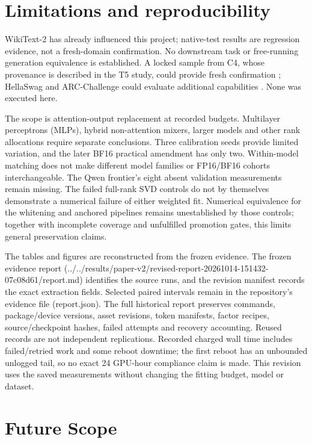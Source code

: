 \documentclass[conference]{IEEEtran}
\begin{document}
\section{Limitations and reproducibility}
WikiText-2 has already influenced this project; native-test results are regression evidence, not a fresh-domain confirmation. No downstream task or free-running generation equivalence is established. A locked sample from C4, whose provenance is described in the T5 study, could provide fresh confirmation \cite{raffel2020t5}; HellaSwag and ARC-Challenge could evaluate additional capabilities \cite{zellers2019hellaswag} \cite{clark2018arc}. None was executed here.\par\smallskip
The scope is attention-output replacement at recorded budgets. Multilayer perceptrons (MLPs), hybrid non-attention mixers, larger models and other rank allocations require separate conclusions. Three calibration seeds provide limited variation, and the later BF16 practical amendment has only two. Within-model matching does not make different model families or FP16/BF16 cohorts interchangeable. The Qwen frontier's eight absent validation measurements remain missing. The failed full-rank SVD controls do not by themselves demonstrate a numerical failure of either weighted fit. Numerical equivalence for the whitening and anchored pipelines remains unestablished by those controls; together with incomplete coverage and unfulfilled promotion gates, this limits general preservation claims.\par\smallskip
The tables and figures are reconstructed from the frozen evidence. The frozen evidence report (../../results/paper-v2/revised-report-20261014-151432-07c08d61/report.md) identifies the source runs, and the revision manifest records the exact extraction fields. Selected paired intervals remain in the repository's evidence file (report.json). The full historical report preserves commands, package/device versions, asset revisions, token manifests, factor recipes, source/checkpoint hashes, failed attempts and recovery accounting. Reused records are not independent replications. Recorded charged wall time includes failed/retried work and some reboot downtime; the first reboot has an unbounded unlogged tail, so no exact 24 GPU-hour compliance claim is made. This revision uses the saved measurements without changing the fitting budget, model or dataset.\par\smallskip
\section{Future Scope}
\end{document}
